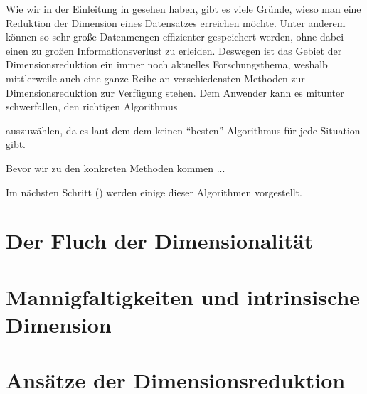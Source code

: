 Wie wir in der Einleitung in  gesehen haben, gibt es viele Gründe, wieso man
eine Reduktion der Dimension eines Datensatzes erreichen möchte. Unter anderem können so sehr große
Datenmengen effizienter gespeichert werden, ohne dabei einen zu großen Informationsverlust zu
erleiden. Deswegen ist das Gebiet der Dimensionsreduktion ein immer noch aktuelles Forschungsthema,
weshalb mittlerweile auch eine ganze Reihe an verschiedensten Methoden zur Dimensionsreduktion zur
Verfügung stehen. Dem Anwender kann es mitunter schwerfallen, den richtigen Algorithmus

auszuwählen, da es laut dem dem  \parencite{Wolpert.1997} keinen \enquote{besten} Algorithmus für jede Situation gibt.

Bevor wir zu den konkreten Methoden kommen ...

Im nächsten Schritt () werden einige dieser Algorithmen vorgestellt.

\section{Der Fluch der Dimensionalität}

\section{Mannigfaltigkeiten und intrinsische Dimension}

\section{Ansätze der Dimensionsreduktion}

